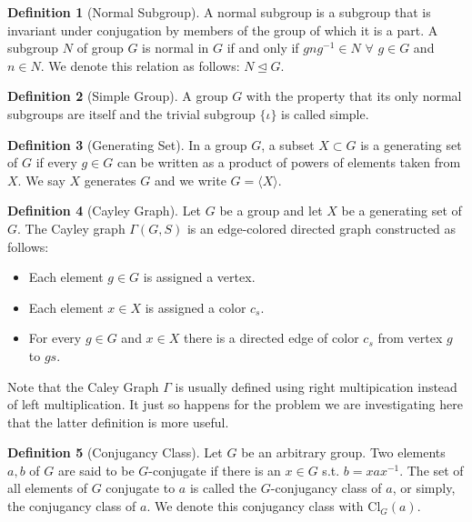 \documentclass[a4paper,10pt]{article}
\theoremstyle{definition}
\newtheorem{definition}{Definition}[section]
\begin{document}
\begin{definition}[Normal Subgroup]
A normal subgroup is  a subgroup that is invariant under conjugation by members of the group of which it is a part. A subgroup $N$ of group $G$ is normal in $G$ if and only if $gng^{-1}\in N$ $\forall$ $g\in G$ and $n\in N$. We denote this relation as follows: $N\unlhd G$.
\end{definition}

\begin{definition}[Simple Group]
A group $G$ with the property that its only normal subgroups are itself and the trivial subgroup $\{\iota\}$ is called simple. 
\end{definition}

\begin{definition}[Generating Set]
In a group $G$, a subset $X\subset G$ is a generating set of $G$ if every $g\in G$ can be written as a product of powers of elements taken from $X$. We say $X$ generates $G$ and we write $G=\langle X\rangle$.
\end{definition}

\begin{definition}[Cayley Graph]
Let $G$ be a group and let $X$ be a generating set of $G$. The Cayley graph $\Gamma(G,S)$ is an edge-colored directed graph constructed as follows:
\begin{itemize}
 \item Each element $g\in G$ is assigned a vertex.
 \item Each element $x \in X$ is assigned a color $c_s$.
 \item For every $g\in G$ and $x\in X$ there is a directed edge of color $c_s$ from vertex $g$ to $gs$.
\end{itemize}
\end{definition}

Note that the Caley Graph $\Gamma$ is usually defined using right multipication instead of left multiplication. It just so happens for the problem we are investigating here that the latter definition is more useful.

\begin{definition}[Conjugancy Class]
Let $G$ be an arbitrary group. Two elements $a,b$ of $G$ are said to be $G$-conjugate if there is an $x\in G$ s.t. $b=xax^{-1}$. The set of all elements of $G$ conjugate to $a$ is called the $G$-conjugancy class of $a$, or simply, the conjugancy class of $a$. We denote this conjugancy class with $\textrm{Cl}_G(a)$. 
\end{definition}
\end{document}
